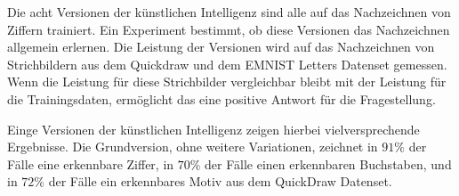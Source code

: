 Die acht Versionen der künstlichen Intelligenz sind alle auf das Nachzeichnen
von Ziffern trainiert. Ein Experiment bestimmt, ob diese Versionen das
Nachzeichnen allgemein erlernen. Die Leistung der Versionen wird auf das
Nachzeichnen von Strichbildern aus dem Quickdraw und dem EMNIST Letters Datenset
gemessen. Wenn die Leistung für diese Strichbilder vergleichbar bleibt mit der
Leistung für die Trainingsdaten, ermöglicht das eine positive Antwort für
die Fragestellung.

Einge Versionen der künstlichen Intelligenz zeigen hierbei vielversprechende
Ergebnisse. Die Grundversion, ohne weitere Variationen, zeichnet in $91\%$ der
Fälle eine erkennbare Ziffer, in $70\%$ der Fälle einen erkennbaren Buchstaben,
und in $72\%$ der Fälle ein erkennbares Motiv aus dem QuickDraw Datenset. 


